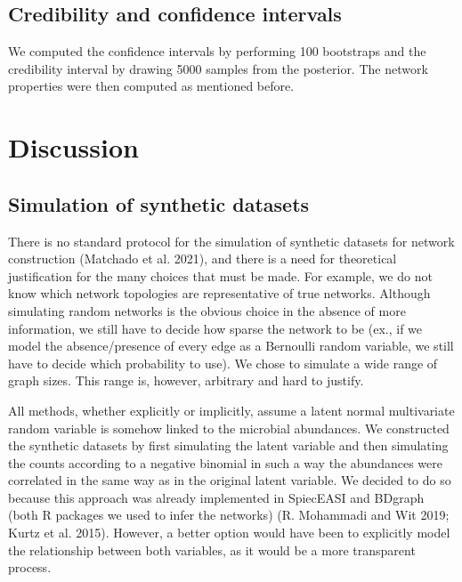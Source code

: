\documentclass[
  a4paper,
]{article}
\begin{document}
\hypertarget{credibility-and-confidence-intervals}{%
\subsection{Credibility and confidence
intervals}\label{credibility-and-confidence-intervals}}

We computed the confidence intervals by performing 100 bootstraps and
the credibility interval by drawing 5000 samples from the posterior. The
network properties were then computed as mentioned before.

\hypertarget{discussion}{%
\section{Discussion}\label{discussion}}

\hypertarget{simulation-of-synthetic-datasets-2}{%
\subsection{Simulation of synthetic
datasets}\label{simulation-of-synthetic-datasets-2}}

There is no standard protocol for the simulation of synthetic datasets
for network construction (Matchado et al. 2021), and there is a need for
theoretical justification for the many choices that must be made. For
example, we do not know which network topologies are representative of
true networks. Although simulating random networks is the obvious choice
in the absence of more information, we still have to decide how sparse
the network to be (ex., if we model the absence/presence of every edge
as a Bernoulli random variable, we still have to decide which
probability to use). We chose to simulate a wide range of graph sizes.
This range is, however, arbitrary and hard to justify.

All methods, whether explicitly or implicitly, assume a latent normal
multivariate random variable is somehow linked to the microbial
abundances. We constructed the synthetic datasets by first simulating
the latent variable and then simulating the counts according to a
negative binomial in such a way the abundances were correlated in the
same way as in the original latent variable. We decided to do so because
this approach was already implemented in SpiecEASI and BDgraph (both R
packages we used to infer the networks) (R. Mohammadi and Wit 2019;
Kurtz et al. 2015). However, a better option would have been to
explicitly model the relationship between both variables, as it would be
a more transparent process.
\end{document}
